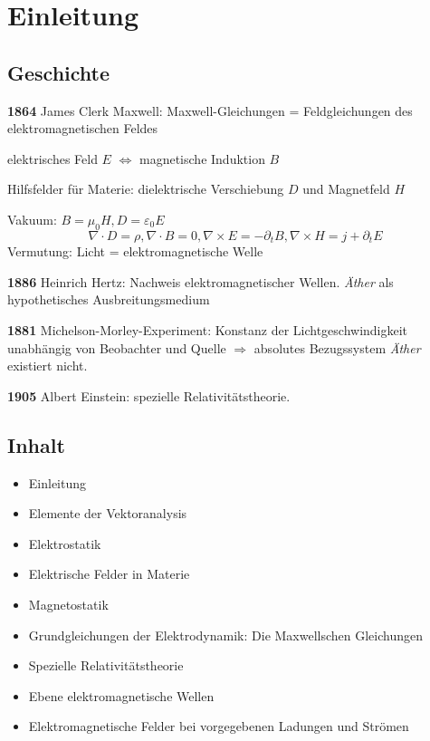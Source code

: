 
\chapter{Einleitung\label{ref-001}}

\section{Geschichte\label{ref-002}}

\textbf{1864} \textendash{} James Clerk Maxwell: Maxwell-Gleichungen = Feldgleichungen des elektromagnetischen Feldes

elektrisches Feld $E$ ${\Leftrightarrow}$ magnetische Induktion $B$

Hilfsfelder für Materie: dielektrische Verschiebung $D$ und Magnetfeld $H$

Vakuum: $B=\mu _{0}H, D=\varepsilon _{0}E$
\begin{equation*}
	\nabla \cdot D=\rho ,\nabla \cdot B=0,\nabla \times E=-\partial _{t}B,\nabla \times H=j+\partial _{t}E
\end{equation*}
Vermutung: Licht = elektromagnetische Welle

\textbf{1886} \textendash{} Heinrich Hertz: Nachweis elektromagnetischer Wellen. \textit{Äther} als hypothetisches Ausbreitungsmedium

\textbf{1881} \textendash{} Michelson-Morley-Experiment: Konstanz der Lichtgeschwindigkeit unabhängig von Beobachter und Quelle ${\Rightarrow}$ absolutes Bezugssystem \textit{Äther} existiert nicht.

\textbf{1905} \textendash{} Albert Einstein: spezielle Relativitätstheorie.

\section{Inhalt\label{ref-003}}


\begin{itemize}
	\item Einleitung

	\item Elemente der Vektoranalysis

	\item Elektrostatik

	\item Elektrische Felder in Materie

	\item Magnetostatik

	\item Grundgleichungen der Elektrodynamik: Die Maxwellschen Gleichungen

	\item Spezielle Relativitätstheorie

	\item Ebene elektromagnetische Wellen

	\item Elektromagnetische Felder bei vorgegebenen Ladungen und Strömen


\end{itemize}
